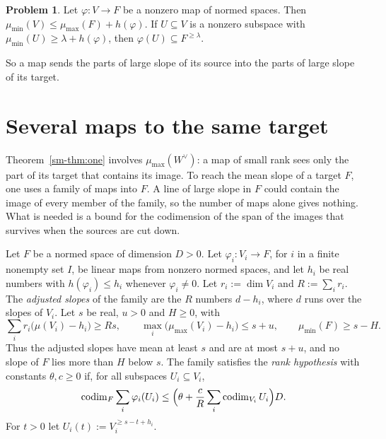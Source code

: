 \documentclass[reqno]{amsart}
\theoremstyle{definition}
\newtheorem{problem}{Problem}[section]
\theoremstyle{plain}
\newcommand{\mumax}{\mu_{\max}}
\newcommand{\mumin}{\mu_{\min}}
\newcommand{\codim}{\operatorname{codim}}
\begin{document}
\begin{problem}\label{pr:slope-map}
Let \(\varphi \colon V \to F\) be a nonzero map of normed spaces.  Then \(\mumin(V) \le \mumax(F) + h(\varphi)\).  If \(U \subseteq V\) is a nonzero subspace with \(\mumin(U) \ge \lambda + h(\varphi)\), then \(\varphi(U) \subseteq F^{\ge\lambda}\).
\end{problem}

So a map sends the parts of large slope of its source into the parts of large slope of its target.

\section{Several maps to the same target}\label{sec:mean}

Theorem~\ref{sm-thm:one} involves \(\mumax(W^\vee)\): a map of small rank sees only the part of its target that contains its image.  To reach the mean slope of a target \(F\), one uses a family of maps into \(F\).  A line of large slope in \(F\) could contain the image of every member of the family, so the number of maps alone gives nothing.  What is needed is a bound for the codimension of the span of the images that survives when the sources are cut down.

Let \(F\) be a normed space of dimension \(D > 0\).  Let \(\varphi_i \colon V_i \to F\), for \(i\) in a finite nonempty set \(I\), be linear maps from nonzero normed spaces, and let \(h_i\) be real numbers with \(h(\varphi_i) \le h_i\) whenever \(\varphi_i \ne 0\).  Let \(r_i := \dim V_i\) and \(R := \sum_i r_i\).  The \emph{adjusted slopes} of the family are the \(R\) numbers \(d - h_i\), where \(d\) runs over the slopes of \(V_i\).  Let \(s\) be real, \(u > 0\) and \(H \ge 0\), with
\begin{equation}\label{eq:suH}
  \sum_i r_i \bigl( \mu(V_i) - h_i \bigr) \ge Rs , \qquad \max_i \bigl( \mumax(V_i) - h_i \bigr) \le s + u , \qquad \mumin(F) \ge s - H .
\end{equation}
Thus the adjusted slopes have mean at least \(s\) and are at most \(s + u\), and no slope of \(F\) lies more than \(H\) below \(s\).  The family satisfies the \emph{rank hypothesis} with constants \(\theta, c \ge 0\) if, for all subspaces \(U_i \subseteq V_i\),
\begin{equation}\label{eq:rank}
  \codim_F \sum_i \varphi_i(U_i) \le \Bigl( \theta + \frac{c}{R} \sum_i \codim_{V_i} U_i \Bigr) D .
\end{equation}
For \(t > 0\) let \(U_i(t) := V_i^{\ge s - t + h_i}\).
\end{document}
